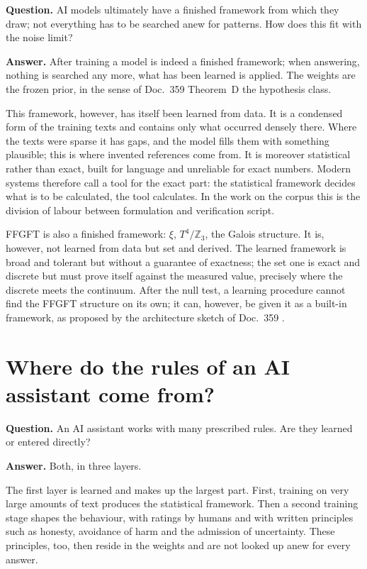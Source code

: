 \textbf{Question.} AI models ultimately have a finished framework from which they draw; not everything
has to be searched anew for patterns. How does this fit with the noise limit?

\textbf{Answer.} After training a model is indeed a finished framework; when answering, nothing is
searched any more, what has been learned is applied. The weights are the frozen prior, in the sense of
Doc.~359 Theorem~D the hypothesis class.

This framework, however, has itself been learned from data. It is a condensed form of the training
texts and contains only what occurred densely there. Where the texts were sparse it has gaps, and the
model fills them with something plausible; this is where invented references come from. It is
moreover statistical rather than exact, built for language and unreliable for exact numbers. Modern
systems therefore call a tool for the exact part: the statistical framework decides what is to be
calculated, the tool calculates. In the work on the corpus this is the division of labour between
formulation and verification script.

FFGFT is also a finished framework: $\xi$, $T^4/\mathbb Z_3$, the Galois structure. It is, however,
not learned from data but set and derived. The learned framework is broad and tolerant but without a
guarantee of exactness; the set one is exact and discrete but must prove itself against the measured
value, precisely where the discrete meets the continuum. After the null test, a learning procedure
cannot find the FFGFT structure on its own; it can, however, be given it as a built-in framework, as
proposed by the architecture sketch of Doc.~359 \SM.

\section{Where do the rules of an AI assistant come from?}

\textbf{Question.} An AI assistant works with many prescribed rules. Are they learned or entered
directly?

\textbf{Answer.} Both, in three layers.

The first layer is learned and makes up the largest part. First, training on very large amounts of
text produces the statistical framework. Then a second training stage shapes the behaviour, with
ratings by humans and with written principles such as honesty, avoidance of harm and the admission of
uncertainty. These principles, too, then reside in the weights and are not looked up anew for every
answer.

